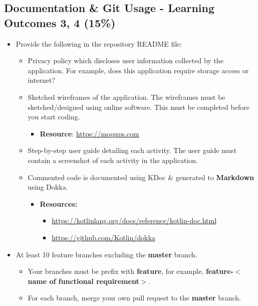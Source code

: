 \documentclass{article}
\begin{document}
\subsection*{Documentation \& Git Usage - Learning Outcomes 3, 4 (15\%)}
\begin{itemize}
	\item Provide the following in the repository README file:
	      \begin{itemize}
	      	\item Privacy policy which discloses user information collected by the application. For example, does this application require storage access or internet? 
	      	\item Sketched wireframes of the application. The wireframes must be sketched/designed using online software. This must be completed before you start coding.
	      	\begin{itemize}
                  \item \textbf{Resource}: \footnotesize\href{https://moqups.com}{https://moqups.com}
              \end{itemize}
	      	\item Step-by-step user guide detailing each activity. The user guide must contain a screenshot of each activity in the application.
	      	\item Commented code is documented using KDoc \& generated to \textbf{Markdown} using Dokka.
	      	      \begin{itemize}
	      	      	\item \textbf{Resources:}
	      	      	      \begin{itemize}
	      	      	      	\item \footnotesize\href{https://kotlinlang.org/docs/reference/kotlin-doc.html}{https://kotlinlang.org/docs/reference/kotlin-doc.html}
	      	      	      	\item \footnotesize\href{https://github.com/Kotlin/dokka}{https://github.com/Kotlin/dokka}
	      	      	      \end{itemize}
	      	      \end{itemize} 
	      \end{itemize}
	\item At least 10 feature branches excluding the \textbf{master} branch.
	      \begin{itemize}
	      	\item Your branches must be prefix with \textbf{feature}, for example, \textbf{feature-$<$name of functional requirement$>$}.
	      	\item For each branch, merge your own pull request to the \textbf{master} branch.

\end{itemize}
\end{itemize}
\end{document}
